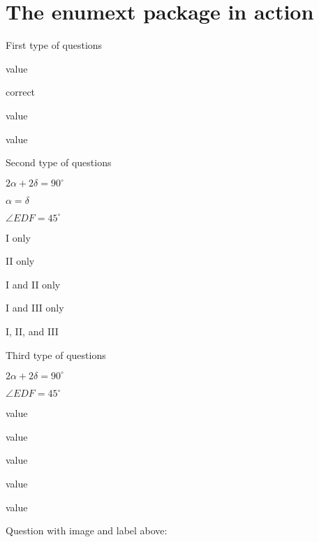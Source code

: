 \documentclass{article}
\begin{document}
\section{The enumext package in action}

\begin{enumext}[save-ans=mytest]
\item First type of questions
  \begin{keyans*}
    \item value
    \item*[$x=5$] correct
    \item value
    \item value
  \end{keyans*}
\item Second type of questions
  \begin{enumext}[myroman]
    \item $2\alpha+2\delta=90^{\circ}$
    \item $\alpha=\delta$
    \item $\angle EDF=45^{\circ}$
  \end{enumext}
  \begin{keyans}
    \item I only
    \item II only
    \item I and II only
    \item* I and III only
    \item I, II, and III
  \end{keyans}
\item* Third type of questions
  \begin{enumext}[myarabic]
    \item $2\alpha+2\delta=90^{\circ}$
    \item $\angle EDF=45^{\circ}$
  \end{enumext}
  \begin{keyans}
    \item value
    \item value
    \item*[some note $y$] value
    \item value
    \item value
  \end{keyans}
\item Question with image and label above:
  \begin{keyanspic}[label-pos=above, layout-sty={3,2}]

\end{keyanspic}
\end{enumext}
\end{document}
